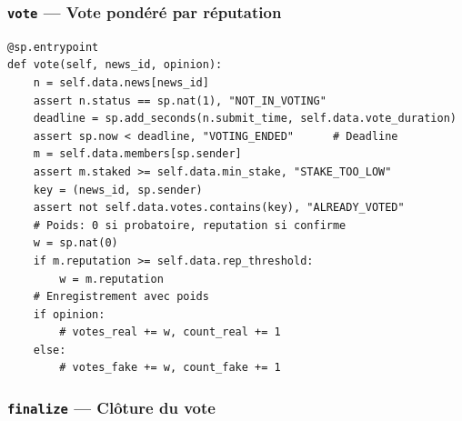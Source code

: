 \documentclass[12pt,a4paper]{article}
\newcommand{\entrypoint}[1]{\textcolor{primary}{\texttt{\textbf{#1}}}}
\begin{document}
\subsubsection{\entrypoint{vote} — Vote pondéré par réputation}

\begin{lstlisting}[language=SmartPy, caption={Entrypoint vote avec poids de reputation}]
@sp.entrypoint
def vote(self, news_id, opinion):
    n = self.data.news[news_id]
    assert n.status == sp.nat(1), "NOT_IN_VOTING"
    deadline = sp.add_seconds(n.submit_time, self.data.vote_duration)
    assert sp.now < deadline, "VOTING_ENDED"      # Deadline
    m = self.data.members[sp.sender]
    assert m.staked >= self.data.min_stake, "STAKE_TOO_LOW"
    key = (news_id, sp.sender)
    assert not self.data.votes.contains(key), "ALREADY_VOTED"
    # Poids: 0 si probatoire, reputation si confirme
    w = sp.nat(0)
    if m.reputation >= self.data.rep_threshold:
        w = m.reputation
    # Enregistrement avec poids
    if opinion:
        # votes_real += w, count_real += 1
    else:
        # votes_fake += w, count_fake += 1
\end{lstlisting}

\subsubsection{\entrypoint{finalize} — Clôture du vote}
\end{document}
